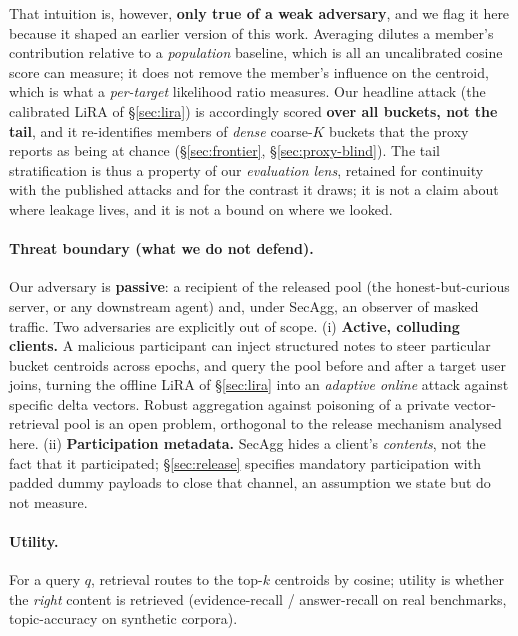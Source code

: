 \documentclass[pdflatex,sn-mathphys-num,iicol]{sn-jnl}
\theoremstyle{thmstyleone}%
\theoremstyle{thmstyletwo}%
\theoremstyle{thmstylethree}%
\newcommand{\secref}[1]{\S\ref{#1}}
\begin{document}
That intuition is, however, \textbf{only true of a weak adversary}, and we flag it here because it
shaped an earlier version of this work. Averaging dilutes a member's contribution relative to a
\emph{population} baseline, which is all an uncalibrated cosine score can measure; it does not
remove the member's influence on the centroid, which is what a \emph{per-target} likelihood ratio
measures. Our headline attack (the calibrated LiRA of \secref{sec:lira}) is accordingly scored
\textbf{over all buckets, not the tail}, and it re-identifies members of \emph{dense} coarse-$K$
buckets that the proxy reports as being at chance (\secref{sec:frontier},
\secref{sec:proxy-blind}). The tail stratification is thus a property of our \emph{evaluation
lens}, retained for continuity with the published attacks and for the contrast it draws; it is
not a claim about where leakage lives, and it is not a bound on where we looked.

\paragraph{Threat boundary (what we do not defend).} Our adversary is
\textbf{passive}: a recipient of the released pool (the honest-but-curious
server, or any downstream agent) and, under SecAgg, an observer of masked
traffic. Two adversaries are explicitly out of scope. (i) \textbf{Active,
colluding clients.} A malicious participant can inject structured notes to steer
particular bucket centroids across epochs, and query the pool before and after a
target user joins, turning the offline LiRA of \secref{sec:lira} into an
\emph{adaptive online} attack against specific delta vectors. Robust aggregation
against poisoning of a private vector-retrieval pool is an open problem,
orthogonal to the release mechanism analysed here. (ii) \textbf{Participation
metadata.} SecAgg hides a client's \emph{contents}, not the fact that it
participated; \secref{sec:release} specifies mandatory participation with padded
dummy payloads to close that channel, an assumption we state but do not measure.

\paragraph{Utility.} For a query $q$, retrieval routes to the top-$k$ centroids by
cosine; utility is whether the \emph{right} content is retrieved
(evidence-recall / answer-recall on real benchmarks, topic-accuracy on synthetic
corpora).
\end{document}
